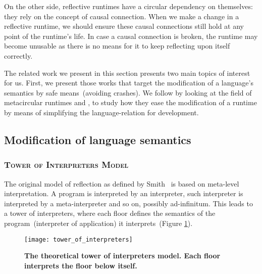 On the other side, reflective runtimes have a circular dependency on themselves: they rely on the concept of causal connection. When we make a change in a reflective runtime, we should ensure these causal connections still hold at any point of the runtime's life. In case a causal connection is broken, the runtime may become unusable as there is no means for it to keep reflecting upon itself correctly.

The related work we present in this section presents two main topics of interest for us. First, we present those works that target the modification of a language's semantics by safe means~(\ie avoiding crashes). We follow by looking at the field of metacircular runtimes and \VMs, to study how they ease the modification of a runtime by means of simplifying the language-\VM relation for development.

\subsection{Modification of language semantics}

\subsubsection*{\textsc{Tower of Interpreters Model}}

The original model of reflection as defined by Smith~\cite{Smit82c} is based on meta-level interpretation. A program is interpreted by an interpreter, such interpreter is interpreted by a meta-interpreter and so on, possibly ad-infinitum. This leads to a tower of interpreters, where each floor defines the semantics of the program~(interpreter of application) it interprets~(Figure \ref{fig:tower_of_interpreters}).

\begin{figure}[ht]
\begin{center}
\texttt{[image: tower\_of\_interpreters]}
\caption{\textbf{The theoretical tower of interpreters model. Each floor interprets the floor below itself.}\label{fig:tower_of_interpreters}
 }
\end{center}
\end{figure}


